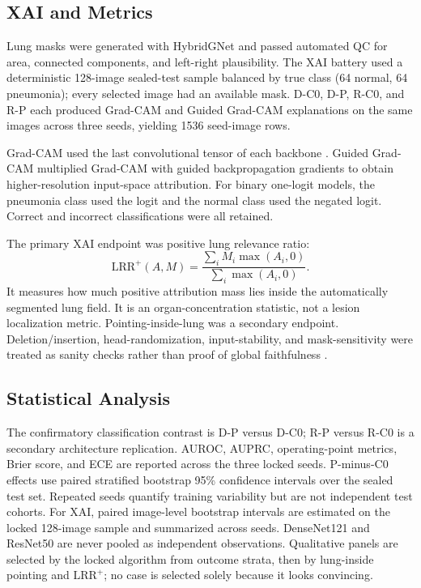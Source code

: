 \documentclass[runningheads]{llncs}
\newcommand{\lrrpos}{\mathrm{LRR}^{+}}
\newcommand{\citep}[1]{\cite{#1}}
\begin{document}
\subsection{XAI and Metrics}

Lung masks were generated with HybridGNet \citep{gaggion2024} and passed
automated QC for area, connected components, and left-right plausibility. The XAI
battery used a deterministic 128-image sealed-test sample balanced by true class
(64 normal, 64 pneumonia); every selected image had an available mask. D-C0, D-P,
R-C0, and R-P each produced Grad-CAM and Guided Grad-CAM explanations on the same
images across three seeds, yielding 1536 seed-image rows.

Grad-CAM used the last convolutional tensor of each backbone \citep{selvaraju2017}.
Guided Grad-CAM multiplied Grad-CAM with guided backpropagation gradients to obtain
higher-resolution input-space attribution. For binary one-logit models, the
pneumonia class used the logit and the normal class used the negated logit.
Correct and incorrect classifications were all retained.

The primary XAI endpoint was positive lung relevance ratio:
\begin{equation}
\lrrpos(A,M)=
\frac{\sum_i M_i\max(A_i,0)}{\sum_i\max(A_i,0)}.
\label{eq:lrr-positive}
\end{equation}
It measures how much positive attribution mass lies inside the automatically
segmented lung field. It is an organ-concentration statistic, not a lesion
localization metric. Pointing-inside-lung was a secondary endpoint.
Deletion/insertion, head-randomization, input-stability, and mask-sensitivity were
treated as sanity checks rather than proof of global faithfulness
\citep{samek2017,petsiuk2018,adebayo2018}.

\subsection{Statistical Analysis}

The confirmatory classification contrast is D-P versus D-C0; R-P versus R-C0 is a
secondary architecture replication. AUROC, AUPRC, operating-point metrics, Brier
score, and ECE are reported across the three locked seeds. P-minus-C0 effects use
paired stratified bootstrap 95\% confidence intervals over the sealed test set.
Repeated seeds quantify training variability but are not independent test cohorts.
For XAI, paired image-level bootstrap intervals are estimated on the locked
128-image sample and summarized across seeds. DenseNet121 and ResNet50 are never
pooled as independent observations. Qualitative panels are selected by the locked
algorithm from outcome strata, then by lung-inside pointing and $\lrrpos$; no case
is selected solely because it looks convincing.
\end{document}
